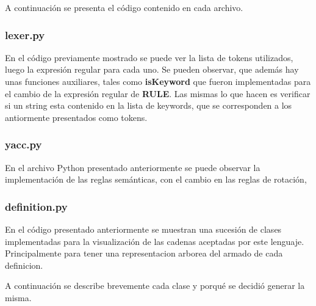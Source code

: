 A continuaci\'on se presenta el c\'odigo contenido en cada archivo.

\newpage
\subsubsection{lexer.py}



En el c\'odigo previamente mostrado se puede ver la lista de tokens utilizados, luego la expresi\'on regular para cada uno. Se pueden observar, que adem\'as hay unas funciones auxiliares, tales como \textbf{isKeyword} que fueron implementadas para el cambio de la expresi\'on regular de \textbf{RULE}. Las mismas lo que hacen es verificar si un string esta contenido en la lista de keywords, que se corresponden a los antiormente presentados como tokens.

\newpage
\subsubsection{yacc.py}



En el archivo Python presentado anteriormente se puede observar la implementaci\'on de las reglas sem\'anticas, con el cambio en las reglas de rotaci\'on, 

\newpage
\subsubsection{definition.py}



En el c\'odigo presentado anteriormente se muestran una sucesi\'on de clases implementadas para la visualizaci\'on de las cadenas aceptadas por este lenguaje. Principalmente para tener una representacion arborea del armado de cada definicion.

A continuaci\'on se describe brevemente cada clase y porqu\'e se decidi\'o generar la misma.

